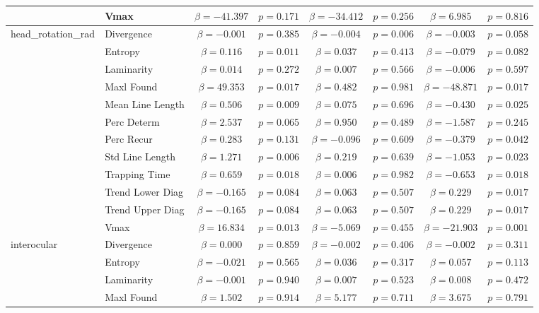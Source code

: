 \begin{tabular}{llcc|cc|cc}
 & Vmax & $\beta = -41.397$ & $p = 0.171$ & $\beta = -34.412$ & $p = 0.256$ & $\beta = 6.985$ & $p = 0.816$ \\
\midrule
\multirow{12}{*}{head_rotation_rad} & Divergence & $\beta = -0.001$ & $p = 0.385$ & $\beta = -0.004$ & $p = 0.006$ & $\beta = -0.003$ & $p = 0.058$ \\
 & Entropy & $\beta = 0.116$ & $p = 0.011$ & $\beta = 0.037$ & $p = 0.413$ & $\beta = -0.079$ & $p = 0.082$ \\
 & Laminarity & $\beta = 0.014$ & $p = 0.272$ & $\beta = 0.007$ & $p = 0.566$ & $\beta = -0.006$ & $p = 0.597$ \\
 & Maxl Found & $\beta = 49.353$ & $p = 0.017$ & $\beta = 0.482$ & $p = 0.981$ & $\beta = -48.871$ & $p = 0.017$ \\
 & Mean Line Length & $\beta = 0.506$ & $p = 0.009$ & $\beta = 0.075$ & $p = 0.696$ & $\beta = -0.430$ & $p = 0.025$ \\
 & Perc Determ & $\beta = 2.537$ & $p = 0.065$ & $\beta = 0.950$ & $p = 0.489$ & $\beta = -1.587$ & $p = 0.245$ \\
 & Perc Recur & $\beta = 0.283$ & $p = 0.131$ & $\beta = -0.096$ & $p = 0.609$ & $\beta = -0.379$ & $p = 0.042$ \\
 & Std Line Length & $\beta = 1.271$ & $p = 0.006$ & $\beta = 0.219$ & $p = 0.639$ & $\beta = -1.053$ & $p = 0.023$ \\
 & Trapping Time & $\beta = 0.659$ & $p = 0.018$ & $\beta = 0.006$ & $p = 0.982$ & $\beta = -0.653$ & $p = 0.018$ \\
 & Trend Lower Diag & $\beta = -0.165$ & $p = 0.084$ & $\beta = 0.063$ & $p = 0.507$ & $\beta = 0.229$ & $p = 0.017$ \\
 & Trend Upper Diag & $\beta = -0.165$ & $p = 0.084$ & $\beta = 0.063$ & $p = 0.507$ & $\beta = 0.229$ & $p = 0.017$ \\
 & Vmax & $\beta = 16.834$ & $p = 0.013$ & $\beta = -5.069$ & $p = 0.455$ & $\beta = -21.903$ & $p = 0.001$ \\
\midrule
\multirow{12}{*}{interocular} & Divergence & $\beta = 0.000$ & $p = 0.859$ & $\beta = -0.002$ & $p = 0.406$ & $\beta = -0.002$ & $p = 0.311$ \\
 & Entropy & $\beta = -0.021$ & $p = 0.565$ & $\beta = 0.036$ & $p = 0.317$ & $\beta = 0.057$ & $p = 0.113$ \\
 & Laminarity & $\beta = -0.001$ & $p = 0.940$ & $\beta = 0.007$ & $p = 0.523$ & $\beta = 0.008$ & $p = 0.472$ \\
 & Maxl Found & $\beta = 1.502$ & $p = 0.914$ & $\beta = 5.177$ & $p = 0.711$ & $\beta = 3.675$ & $p = 0.791$ \\

\end{tabular}
